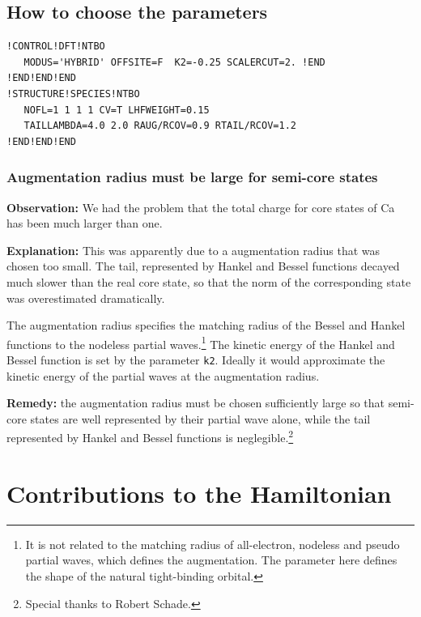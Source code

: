 \documentclass[11pt,a4paper]{report}
\begin{document}
\section{How to choose the parameters}
\begin{verbatim}
!CONTROL!DFT!NTBO 
   MODUS='HYBRID' OFFSITE=F  K2=-0.25 SCALERCUT=2. !END
!END!END!END
!STRUCTURE!SPECIES!NTBO    
   NOFL=1 1 1 1 CV=T LHFWEIGHT=0.15
   TAILLAMBDA=4.0 2.0 RAUG/RCOV=0.9 RTAIL/RCOV=1.2
!END!END!END
\end{verbatim}

\subsection{Augmentation radius must be large for semi-core states}
\textbf{Observation:} We had the problem that the total charge for
core states of Ca has been much larger than one.


\textbf{Explanation:} This was apparently due to a augmentation radius
that was chosen too small. The tail, represented by Hankel and Bessel
functions decayed much slower than the real core state, so that the
norm of the corresponding state was overestimated dramatically.

The augmentation radius specifies the matching radius of the Bessel
and Hankel functions to the nodeless partial waves.\footnote{It is not
  related to the matching radius of all-electron, nodeless and pseudo
  partial waves, which defines the augmentation. The parameter here
  defines the shape of the natural tight-binding orbital.} The kinetic
energy of the Hankel and Bessel function is set by the parameter
\verb|k2|. Ideally it would approximate the kinetic energy of the
partial waves at the augmentation radius.

\textbf{Remedy:} the augmentation radius must be chosen sufficiently
large so that semi-core states are well represented by their partial
wave alone, while the tail represented by Hankel and Bessel functions
is neglegible.\footnote{Special thanks to Robert Schade.}


\chapter{Contributions to the Hamiltonian}
\end{document}
